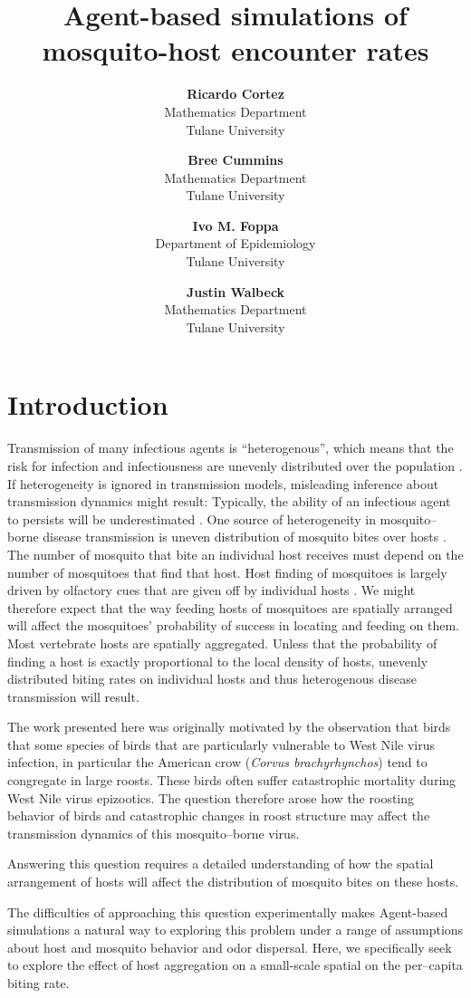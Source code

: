 \documentclass[12pt]{article}
\title{Agent-based simulations of mosquito-host encounter rates}
\author{
\textbf{Ricardo Cortez}\\
   \small{Mathematics Department}\\
   \small{Tulane University}\\ \and
\textbf{Bree Cummins}\\
   \small{Mathematics Department}\\
   \small{Tulane University}\\ \and
\textbf{Ivo M. Foppa}\\
   \small{Department of Epidemiology}\\
   \small{Tulane University}\\ \and
\textbf{Justin Walbeck}\\
   \small{Mathematics Department}\\
   \small{Tulane University}\\ 
}
\begin{document}
	
	\tableofcontents
	
	\maketitle
	
\section{Introduction}
Transmission of many infectious agents is ``heterogenous'', which means that the risk for infection and infectiousness are unevenly distributed over the population \cite{Woolhouse1997}.
If heterogeneity is ignored in transmission models, misleading inference about transmission dynamics might result: Typically, the ability of an infectious agent to persists will be underestimated \cite{Hasibeder1988}.
One source of heterogeneity in mosquito--borne disease transmission is uneven distribution of mosquito bites over hosts \cite{Dye1986}.
The number of mosquito that bite an individual host receives must depend on  the number of mosquitoes that find that host.
Host finding of mosquitoes is largely driven by olfactory cues that are given off by individual hosts \cite{Lehane1991}.
We might therefore expect that  the way  feeding hosts of mosquitoes are spatially arranged will affect the mosquitoes' probability of success in locating and feeding on them. Most vertebrate hosts are spatially aggregated.
Unless that the probability of finding a host is exactly proportional to the local density of hosts,
unevenly distributed biting rates on individual hosts and thus heterogenous disease transmission will result.

The work presented here was originally motivated by the observation that birds that some species of birds that are particularly vulnerable to West Nile virus infection, in particular the American crow (\textit{Corvus brachyrhynchos}) tend to congregate in large roosts. These birds often suffer catastrophic mortality during West Nile virus epizootics. The question therefore arose how the roosting behavior of birds and catastrophic changes in roost structure may affect the transmission dynamics of this mosquito--borne virus.

Answering this question requires a detailed understanding of how the spatial arrangement of hosts will affect the distribution of mosquito bites on these hosts.

The difficulties of approaching this question experimentally makes
Agent-based simulations a natural way to exploring this problem under a range of assumptions about host and  mosquito behavior and odor dispersal.
Here, we specifically seek to explore the effect of host aggregation on a small-scale spatial on the per--capita biting rate.
\end{document}

